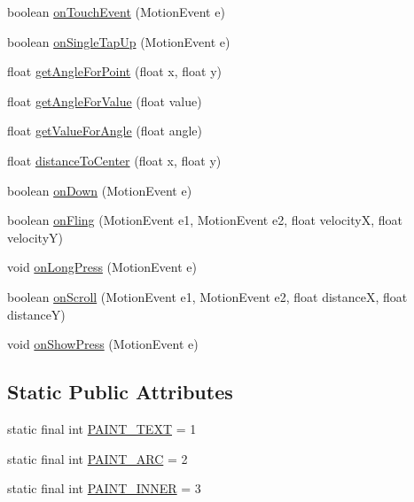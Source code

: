 \begin{DoxyCompactItemize}
\item 
boolean \hyperlink{classcs_1_1nsense_1_1_circle_display_a2550cf104c7bbcab2ce3fba67ef82654}{on\-Touch\-Event} (Motion\-Event e)
\item 
boolean \hyperlink{classcs_1_1nsense_1_1_circle_display_ab3ac50fd3a122036c4d37b2b29a35ebf}{on\-Single\-Tap\-Up} (Motion\-Event e)
\item 
float \hyperlink{classcs_1_1nsense_1_1_circle_display_adfb586b25ad08dee0b3cd5f5e5f69c90}{get\-Angle\-For\-Point} (float x, float y)
\item 
float \hyperlink{classcs_1_1nsense_1_1_circle_display_a63616b69f8d947499393f4c05c05477f}{get\-Angle\-For\-Value} (float value)
\item 
float \hyperlink{classcs_1_1nsense_1_1_circle_display_af94e44e94fc8a445c36865fb3759d43b}{get\-Value\-For\-Angle} (float angle)
\item 
float \hyperlink{classcs_1_1nsense_1_1_circle_display_a3c45fe10eae933597e60f86a8f8609fd}{distance\-To\-Center} (float x, float y)
\item 
boolean \hyperlink{classcs_1_1nsense_1_1_circle_display_a716c00aeed8b46601d3819c787f1b663}{on\-Down} (Motion\-Event e)
\item 
boolean \hyperlink{classcs_1_1nsense_1_1_circle_display_a9104f6d606bdf7bc7737c6a11441f0cc}{on\-Fling} (Motion\-Event e1, Motion\-Event e2, float velocity\-X, float velocity\-Y)
\item 
void \hyperlink{classcs_1_1nsense_1_1_circle_display_ab00fdef26bf4ce7003220f6289f35431}{on\-Long\-Press} (Motion\-Event e)
\item 
boolean \hyperlink{classcs_1_1nsense_1_1_circle_display_a939eefe9f7b9549832a17907b3f8ac26}{on\-Scroll} (Motion\-Event e1, Motion\-Event e2, float distance\-X, float distance\-Y)
\item 
void \hyperlink{classcs_1_1nsense_1_1_circle_display_a44ac82515ca6682c961349677073f66b}{on\-Show\-Press} (Motion\-Event e)
\end{DoxyCompactItemize}
\subsection*{Static Public Attributes}
\begin{DoxyCompactItemize}
\item 
static final int \hyperlink{classcs_1_1nsense_1_1_circle_display_a3fd835443f832fd142d81cfa86aeb3ab}{P\-A\-I\-N\-T\-\_\-\-T\-E\-X\-T} = 1
\item 
static final int \hyperlink{classcs_1_1nsense_1_1_circle_display_a34329310fb725ecb64e1a38f64310349}{P\-A\-I\-N\-T\-\_\-\-A\-R\-C} = 2
\item 
static final int \hyperlink{classcs_1_1nsense_1_1_circle_display_aac680b4b8e9add29178a812efbf267f6}{P\-A\-I\-N\-T\-\_\-\-I\-N\-N\-E\-R} = 3
\end{DoxyCompactItemize}
